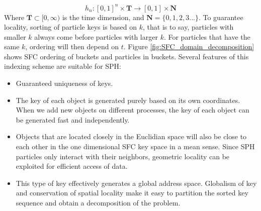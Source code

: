 \begin{equation}
h_n: [0,1]^n \times \textbf{T} \rightarrow [0,1] \times \textbf{N}
\end{equation}
Where $\textbf{T} \subset [0,\infty)$ is the time dimension, and $\textbf{N}=\lbrace 0, 1, 2, 3...\rbrace$.
To guarantee locality, sorting of particle keys is based on $k$, that is to say, particles with smaller $k$ always come before particles with larger $k$. For particles that have the same $k$, ordering will then depend on $t$. Figure \ref{fig:SFC_domain_decomposition} shows SFC ordering of buckets and particles in buckets. 
Several features of this indexing scheme are suitable for SPH:
\begin{itemize}
\item Guaranteed uniqueness of keys.
\item The key of each object is generated purely based on its own coordinates. When we add new objects on different processes, the key of each object can be generated fast and independently.
\item Objects that are located closely in the Euclidian space will also be close to each other in the one dimensional SFC key space in a mean sense. Since SPH particles only interact with their neighbors, geometric locality can be exploited for efficient access of data.
\item This type of key effectively generates a global address space. Globalism of key and conservation of spatial locality make it easy to partition the sorted key sequence and obtain a decomposition of the problem.
\end{itemize}
